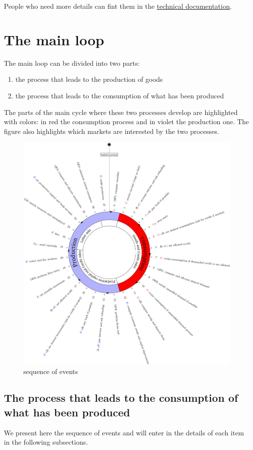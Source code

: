 \documentclass{book}
\newcommand{\doclocation}{file:///Users/giulioni/Documents/workspace/gabriele/docs}
\begin{document}
People who need more details can fint them in the \href{\doclocation/index_initialization.html}{technical documentation}.

\newpage
\section{The main loop}\label{sec:mainloop}
The main loop can be divided into two parts:
\begin{enumerate}
	\item the process that leads to the production of goods
	\item the process that leads to the consumption of what has been produced
\end{enumerate}
The parts of the main cycle where these two processes develop are highlighted with colors: in red the consumption process and in violet the production one. The figure also highlights which markets are interested by the two processes.

\begin{figure}[htp]
	\centering
\includegraphics[scale=0.5]{visual1.pdf}
	\caption{sequence of events}
	\label{fig:clockcolor}
\end{figure}

\subsection{The process that leads to the consumption of what has been produced}
We present here the sequence of events and will enter in the details of each item in the following subsections.
\end{document}
